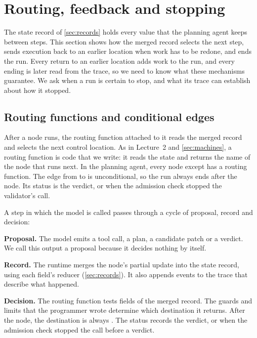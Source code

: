 \section{Routing, feedback and stopping}
\label{sec:routing}

The state record of \cref{sec:records} holds every value that the planning agent keeps between
steps. This section shows how the merged record selects the next step, sends execution back to an
earlier location when work has to be redone, and ends the run. Every return to an earlier location
adds work to the run, and every ending is later read from the trace, so we need to know what these
mechanisms guarantee. We ask when a run is certain to stop, and what its trace can establish about
how it stopped.

\subsection{Routing functions and conditional edges}
\label{sec:routing-functions}

After a node runs, the routing function attached to it reads the merged record and selects the next
control location. As in Lecture~2 and \cref{sec:machines}, a routing function is code that we write:
it reads the state and returns the name of the node that runs next. In the planning agent, every
node except  has a routing function. The edge from  to
 is unconditional, so the run always ends after the  node. Its
status is the verdict, or  when the admission check stopped the
validator's call.

A step in which the model is called passes through a cycle of proposal, record and decision:
\bi
\item \textbf{Proposal.} The model emits a tool call, a plan, a candidate patch or a verdict. We
call this output a proposal because it decides nothing by itself.
\item \textbf{Record.} The runtime merges the node's partial update into the state record, using
each field's reducer (\cref{sec:records}). It also appends events to the trace that describe what
happened.
\item \textbf{Decision.} The routing function tests fields of the merged record. The guards and
limits that the programmer wrote determine which destination it returns. After the
 node, the destination is always . The status records the verdict, or
 when the admission check stopped the call before a verdict.
\ei

